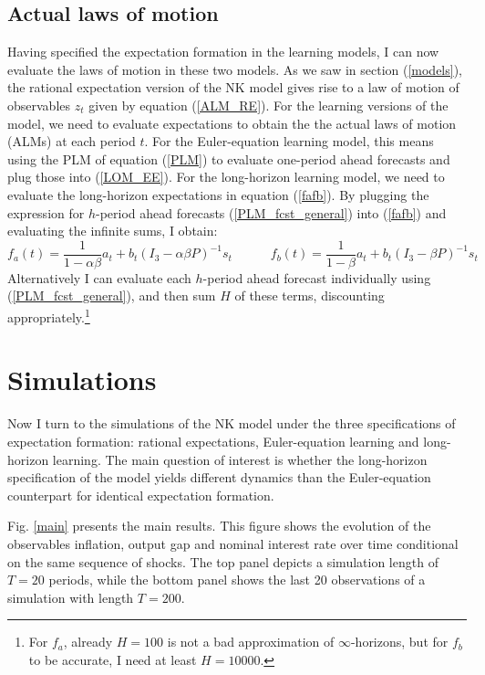 \documentclass[11pt]{article}
\renewcommand{\[}{\begin{equation}}
\renewcommand{\]}{\end{equation}}
\begin{document}
\subsection{Actual laws of motion}\label{ALMs}
Having specified the expectation formation in the learning models, I can now evaluate the laws of motion in these two models. As we saw in section (\ref{models}), the rational expectation version of the NK model gives rise to a law of motion of observables $z_t$ given by equation (\ref{ALM_RE}). For the learning versions of the model, we need to evaluate expectations to obtain the the actual laws of motion (ALMs) at each period $t$. For the Euler-equation learning model, this means using the PLM of equation (\ref{PLM}) to evaluate one-period ahead forecasts and plug those into (\ref{LOM_EE}). For the long-horizon learning model, we need to evaluate the long-horizon expectations in equation (\ref{fafb}). By plugging the expression for $h$-period ahead forecasts (\ref{PLM_fcst_general}) into (\ref{fafb}) and evaluating the infinite sums, I obtain:
\begin{equation}
f_a(t) = \frac{1}{1-\alpha\beta}a_{t}  + b_{t}(I_3 - \alpha\beta P)^{-1}s_t \quad \quad \quad f_b(t) = \frac{1}{1-\beta}a_{t}  + b_{t}(I_3 - \beta P)^{-1}s_t  \label{fafb_analytical_general}
\end{equation}
Alternatively I can evaluate each $h$-period ahead forecast individually using (\ref{PLM_fcst_general}), and then sum $H$ of these terms, discounting appropriately.\footnote{For $f_a$, already $H=100$ is not a bad approximation of $\infty$-horizons, but for $f_b$ to be accurate, I need at least $H=10000$.}

\section{Simulations}	\label{simulations}
Now I turn to the simulations of the NK model under the three specifications of expectation formation: rational expectations, Euler-equation learning and long-horizon learning. The main question of interest is whether the long-horizon specification of the model yields different dynamics than the Euler-equation counterpart for identical expectation formation. 

Fig. \ref{main} presents the main results. This figure shows the evolution of the observables inflation, output gap and nominal interest rate over time conditional on the same sequence of shocks. The top panel depicts a simulation length of $T=20$ periods, while the bottom panel shows the last 20 observations of a simulation with length $T=200$. 
\end{document}
